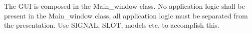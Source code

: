The G\-U\-I is composed in the Main\-\_\-window class. No application logic shall be present in the Main\-\_\-window class, all application logic must be separated from the presentation. Use S\-I\-G\-N\-A\-L, S\-L\-O\-T, models etc. to accomplish this. 